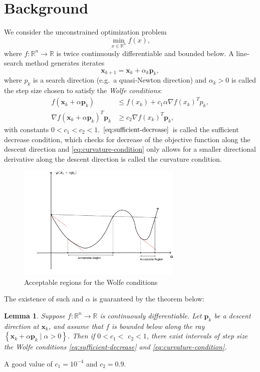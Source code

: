 \documentclass[12pt]{report}
\newtheorem{lemma}{Lemma}[section]
\begin{document}
\section{Background}
We consider the unconstrained optimization problem
\[
	\min_{x\in\mathbb{R}^n} f(x),
\]
where $f:\mathbb{R}^n\to\mathbb{R}$ is twice continuously differentiable and bounded below.
A line‐search method generates iterates
\begin{equation}
	\bm x_{k+1} = \bm x_k + \alpha_k \bm p_k, \label{eq:opt_update}
\end{equation}
where $p_k$ is a search direction (e.g.\ a quasi‐Newton direction) and $\alpha_k>0$ is called the step size chosen to satisfy the \emph{Wolfe conditions}:
\begin{align}
	f(\bm x_k + \alpha \bm p_k)                  & \le f(x_k) + c_1 \alpha \nabla f(x_k)^T p_k, \label{eq:sufficient-decrease} \\
	\nabla f(\bm x_k + \alpha \bm p_k)^T \bm p_k & \ge c_2 \nabla f(x_k)^T \bm p_k \label{eq:curvature-condition},
\end{align}
with constants $0 < c_1 < c_2 < 1$.
$\ref{eq:sufficient-decrease}$ is called the sufficient decrease condition, which checks for decrease of the objective function along the descent direction and \ref{eq:curvature-condition} only allows for a smaller directional derivative along the descent direction is called the curvature condition.

\begin{figure}[htpb]
	\centering
	\includegraphics[width=0.7\textwidth]{./drawing.png}
	\caption{Acceptable regions for the Wolfe conditions}
	\label{fig:Wolfe}
\end{figure}
The existence of such and $\alpha$ is guaranteed by the theorem below:
\begin{lemma}
	Suppose $f: \mathbb{R}^n \rightarrow \mathbb{R}$ is continuously differentiable. Let $\bm p_k$ be a descent direction at $\bm x_k$, and assume that $f$ is bounded below along the ray $\left\{\bm x_k+\alpha \bm p_k \mid \alpha>0\right\}$. Then if $0<c_1<$ $c_2<1$, there exist intervals of step size the Wolfe conditions \eqref{eq:sufficient-decrease} and \eqref{eq:curvature-condition}.
\end{lemma}
A good value of $c_1 = 10^{-4}$ and $c_2 = 0.9$.\cite{nocedal}
\end{document}
